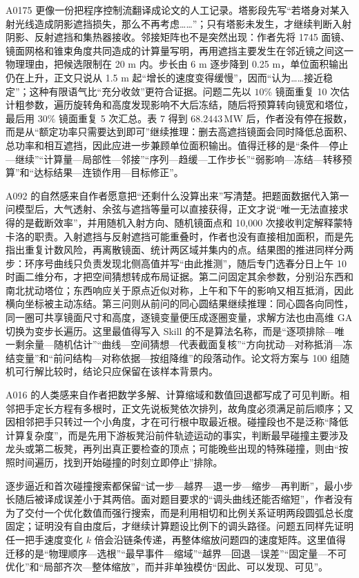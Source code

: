 A0175 更像一份把程序控制流翻译成论文的人工记录。塔影段先写“若塔身对某入射光线造成阴影遮挡损失，那么不再考虑……”；只有塔影未发生，才继续判断入射阴影、反射遮挡和集热器接收。邻接矩阵也不是突然出现：作者先将 1745 面镜、镜面网格和锥束角度共同造成的计算量写明，再用遮挡主要发生在邻近镜之间这一物理理由，把候选限制在 20 m 内。步长由 6 m 逐步降到 0.25 m，单位面积输出仍在上升，正文只说从 1.5 m 起“增长的速度变得缓慢”，因而“认为……接近稳定”；这种有限语气比“充分收敛”更符合证据。问题二先以 $10\%$ 镜面重复 10 次估计粗参数，遍历旋转角和高度发现影响不大后冻结，随后将预算转向镜宽和塔位，最后用 $30\%$ 镜面重复 5 次汇总。表 7 得到 $68.2443\,\mathrm{MW}$ 后，作者没有停在报数，而是从“额定功率只需要达到即可”继续推理：删去高遮挡镜面会同时降低总面积、总功率和相互遮挡，因此应进一步兼顾单位面积输出。值得迁移的是“条件—停止—继续”“计算量—局部性—邻接”“序列—趋缓—工作步长”“弱影响—冻结—转移预算”和“达标结果—连锁作用—目标修正”。

A092 的自然感来自作者愿意把“还剩什么没算出来”写清楚。把题面数据代入第一问模型后，大气透射、余弦与遮挡等量可以直接获得，正文才说“唯一无法直接求得的是截断效率”，并用随机入射方向、随机镜面点和 10,000 次接收判定解释蒙特卡洛的职责。入射遮挡与反射遮挡可能重叠时，作者也没有直接相加面积，而是先指出重复计数风险，再离散镜面、统计两区域并集内的点。结果图的推进同样分两步：环序号曲线只负责发现北侧高值并写“由此推测”，随后专门选春分日上午 10 时画二维分布，才把空间猜想转成布局证据。第二问固定其余参数，分别沿东西和南北扰动塔位；东西响应关于原点近似对称，上午和下午的影响又相互抵消，因此横向坐标被主动冻结。第三问则从前问的同心圆结果继续推理：同心圆各向同性，同一圈可共享镜面尺寸和高度，逐镜变量便压成逐圈变量，求解方法也由高维 GA 切换为变步长遍历。这里最值得写入 Skill 的不是算法名称，而是“逐项排除—唯一剩余量—随机估计”“曲线—空间猜想—代表截面复核”“方向扰动—对称抵消—冻结变量”和“前问结构—对称依据—按组降维”的段落动作。论文将方案与 100 组随机可行解比较时，结论只应保留在该样本背景内。

A016 的人类感来自作者把数学多解、计算缩域和数值回退都写成了可见判断。相邻把手定长方程有多根时，正文先说板凳依次排列，故角度必须满足前后顺序；又因相邻把手只转过一个小角度，才在可行根中取最近根。碰撞段也不是泛称“降低计算复杂度”，而是先用下游板凳沿前件轨迹运动的事实，判断最早碰撞主要涉及龙头或第二板凳，再列出真正要检查的顶点；可能晚些出现的特殊碰撞，则由“按照时间遍历，找到开始碰撞的时刻立即停止”排除。

逐步逼近和首次碰撞搜索都保留“试一步—越界—退一步—缩步—再判断”，最小步长随后被译成误差小于其两倍。面对题目要求的“调头曲线还能否缩短”，作者没有为了交付一个优化数值而强行搜索，而是利用相切和比例关系证明两段圆弧总长度固定；证明没有自由度后，才继续计算题设比例下的调头路径。问题五同样先证明任一把手速度变化 $k$ 倍会沿链条传递，再整体缩放问题四的速度矩阵。这里值得迁移的是“物理顺序—选根”“最早事件—缩域”“越界—回退—误差”“固定量—不可优化”和“局部齐次—整体缩放”，而并非单独模仿“因此、可以发现、可见”。

